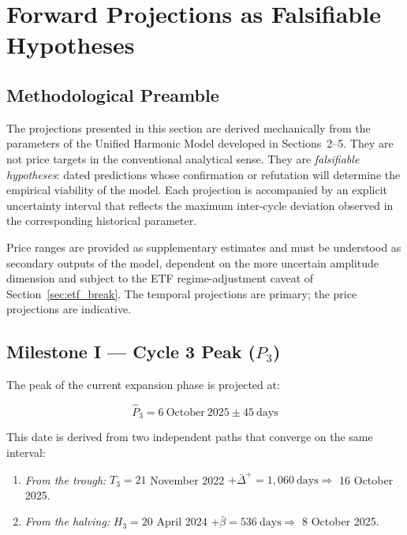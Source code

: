 \section{Forward Projections as Falsifiable Hypotheses}

\subsection{Methodological Preamble}

The projections presented in this section are derived mechanically from the
parameters of the Unified Harmonic Model developed in Sections~2--5. They are
not price targets in the conventional analytical sense. They are
\textit{falsifiable hypotheses}: dated predictions whose confirmation or
refutation will determine the empirical viability of the model. Each projection
is accompanied by an explicit uncertainty interval that reflects the maximum
inter-cycle deviation observed in the corresponding historical parameter.

Price ranges are provided as supplementary estimates and must be understood as
secondary outputs of the model, dependent on the more uncertain amplitude
dimension and subject to the ETF regime-adjustment caveat of
Section~\ref{sec:etf_break}. The temporal projections are primary; the price
projections are indicative.

\subsection{Milestone I --- Cycle 3 Peak ($P_3$)}

The peak of the current expansion phase is projected at:

\begin{equation}
  \hat{P}_3 = 6\ \text{October}\ 2025
              \pm 45\ \text{days}
  \label{eq:p3_projection}
\end{equation}

This date is derived from two independent paths that converge on the same
interval:

\begin{enumerate}
  \item \textit{From the trough:} $T_3 = 21$ November 2022 $+ \bar{\Delta}^{+}
  = 1{,}060\ \text{days} \Rightarrow$ 16 October 2025.
  \item \textit{From the halving:} $H_3 = 20$ April 2024 $+ \bar{\beta} =
  536\ \text{days} \Rightarrow$ 8 October 2025.
\end{enumerate}

